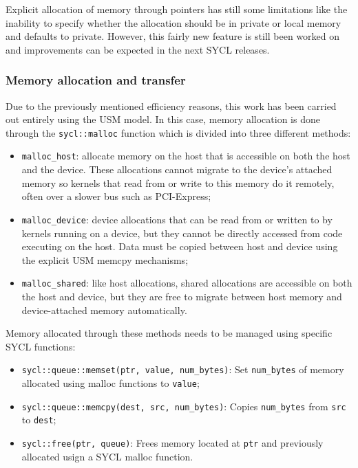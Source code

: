 Explicit allocation of memory through pointers has still some limitations like the inability to specify whether the allocation should be in private or local memory and defaults to private. However, this fairly new feature is still been worked on and improvements can be expected in the next SYCL releases.

\subsubsection{Memory allocation and transfer}
Due to the previously mentioned efficiency reasons, this work has been carried out entirely using the USM model. In this case, memory allocation is done through the \texttt{sycl::malloc} function which is divided into three different methods:

\begin{itemize}
    \item \texttt{malloc\_host}: allocate memory on the host that is accessible on both the host and the device. These allocations cannot migrate to the device’s attached memory so kernels that read from or write to this memory do it remotely, often over a slower bus such as PCI-Express;
    \item \texttt{malloc\_device}: device allocations that can be read from or written to by kernels running on a device, but they cannot be directly accessed from code executing on the host. Data must be copied between host and device using the explicit USM memcpy mechanisms;
    \item \texttt{malloc\_shared}: like host allocations, shared allocations are accessible on both the host and device, but they are free to migrate between host memory and device-attached memory automatically.
\end{itemize}

Memory allocated through these methods needs to be managed using specific SYCL functions:

\begin{itemize}
    \item \texttt{sycl::queue::memset(ptr, value, num\_bytes)}: Set \texttt{num\_bytes} of memory allocated using malloc functions to \texttt{value};
    \item \texttt{sycl::queue::memcpy(dest, src, num\_bytes)}: Copies \texttt{num\_bytes} from \texttt{src} to \texttt{dest};
    \item \texttt{sycl::free(ptr, queue)}: Frees memory located at \texttt{ptr} and previously allocated usign a SYCL malloc function.
\end{itemize}

